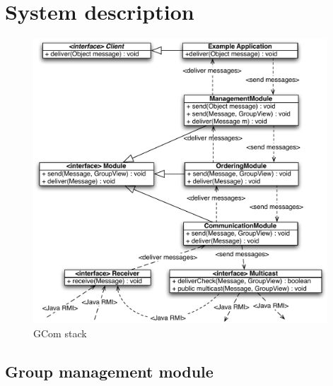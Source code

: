 \documentclass[titlepage, twocolumn, a4paper, 10pt]{article}
\begin{document}
\section{System description}\label{sec:system}



\begin{figure}[!t]
  \centerline{\includegraphics[width=110mm]{images/Stack.pdf}}
  \caption{GCom stack}
  \label{fig:images/Stack}
\end{figure}



\subsection{Group management module}\label{sec:group-management-module}
\end{document}

